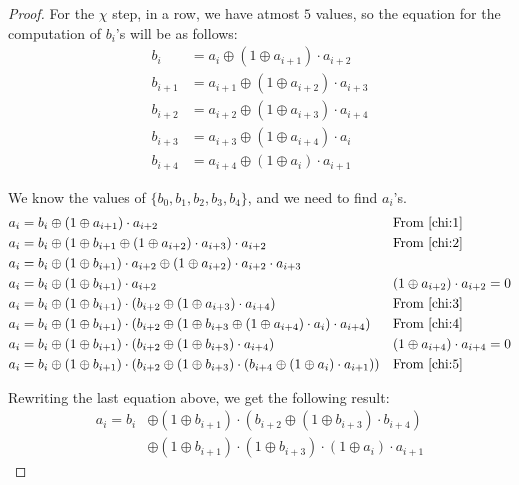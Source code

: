 \documentclass[10pt,twoside]{article}
\begin{document}
\begin{proof}
  For the $\chi$ step, in a row, we have atmost $5$ values, so the equation for the computation of $b_i$'s will be as follows:
  \begin{align}
    b_i &= a_i \oplus (1 \oplus a_{i+1}) \cdot a_{i+2} \label{chi:1} \\
    b_{i+1} &= a_{i+1} \oplus (1 \oplus a_{i+2}) \cdot a_{i+3} \label{chi:2} \\
    b_{i+2} &= a_{i+2} \oplus (1 \oplus a_{i+3}) \cdot a_{i+4} \label{chi:3} \\
    b_{i+3} &= a_{i+3} \oplus (1 \oplus a_{i+4}) \cdot a_i \label{chi:4} \\
    b_{i+4} &= a_{i+4} \oplus (1 \oplus a_i) \cdot a_{i+1} \label{chi:5}
  \end{align}

  We know the values of $\{b_0, b_1, b_2, b_3, b_4\}$, and we need to find $a_i$'s.
  \begin{align*}
    a_i &= b_i \oplus (1 \oplus a_{i+1})\cdot a_{i+2} && \text{From \cref{chi:1}} \\
    a_i &= b_i \oplus (1 \oplus b_{i+1} \oplus (1 \oplus a_{i+2})\cdot a_{i+3})\cdot a_{i+2} && \text{From \cref{chi:2}} \\
    a_i &= b_i \oplus (1 \oplus b_{i+1})\cdot a_{i+2} \oplus (1 \oplus a_{i+2})\cdot a_{i+2}\cdot a_{i+3} \\
    a_i &= b_i \oplus (1 \oplus b_{i+1})\cdot a_{i+2} && \text{$(1 \oplus a_{i+2})\cdot a_{i+2} = 0$} \\
    a_i &= b_i \oplus (1 \oplus b_{i+1})\cdot (b_{i+2} \oplus (1 \oplus a_{i+3})\cdot a_{i+4}) && \text{From \cref{chi:3}} \\
    a_i &= b_i \oplus (1 \oplus b_{i+1})\cdot (b_{i+2} \oplus (1 \oplus b_{i+3} \oplus (1 \oplus a_{i+4})\cdot a_i)\cdot a_{i+4}) && \text{From \cref{chi:4}} \\
    a_i &= b_i \oplus (1 \oplus b_{i+1})\cdot (b_{i+2} \oplus (1 \oplus b_{i+3})\cdot a_{i+4}) && \text{$(1 \oplus a_{i+4})\cdot a_{i+4} = 0$} \\
    a_i &= b_i \oplus (1 \oplus b_{i+1})\cdot (b_{i+2} \oplus (1 \oplus b_{i+3})\cdot (b_{i+4} \oplus (1 \oplus a_i)\cdot a_{i+1})) && \text{From \cref{chi:5}}
  \end{align*}

  Rewriting the last equation above, we get the following result:
  \begin{equation}
    \begin{split}
    a_i = b_i &\oplus (1 \oplus b_{i+1})\cdot (b_{i+2} \oplus (1 \oplus b_{i+3})\cdot b_{i+4}) \\
    &\oplus (1\oplus b_{i+1})\cdot(1\oplus b_{i+3})\cdot(1 \oplus a_i)\cdot a_{i+1}
    \end{split} \label{chi:6}
  \end{equation}


\end{proof}
\end{document}
